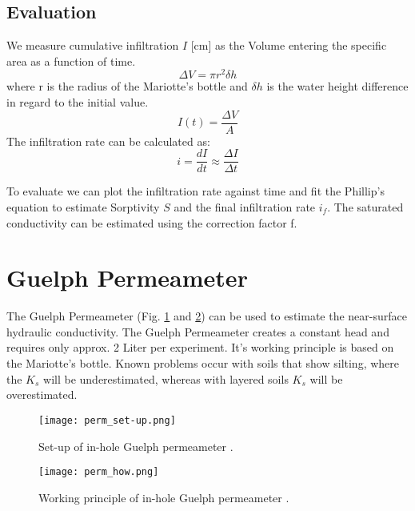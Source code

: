 \documentclass[
10pt, %
a4paper, %
oneside, %
headinclude,footinclude, %
BCOR5mm, %
]{scrartcl}
\begin{document}
\subsection{Evaluation}
We measure cumulative infiltration $I$ [cm] as the Volume entering the specific area as a function of time. 
 \begin{equation}\label{eq_infSR}
 \Delta V= \pi r^2 \delta h
 \end{equation}
 where r is the radius of the Mariotte's bottle and $\delta h$ is the water height difference in regard to the initial value.
 \begin{equation}\label{eq_infSR}
I(t) =\frac{\Delta V}{A}
 \end{equation}
The infiltration rate can be calculated as:
 \begin{equation}\label{eq_infSR}
 i = \frac{dI}{dt}\approx\frac{\Delta I}{\Delta t}
 \end{equation}

To evaluate we can plot the infiltration rate against time and fit the Phillip's equation to estimate Sorptivity $S$ and the final infiltration rate $i_f$. The saturated conductivity can be estimated using the correction factor f. 
\newpage

\section{Guelph Permeameter}

The Guelph Permeameter (Fig. \ref{GPsetup} and \ref{GPwork}) can be used to estimate the near-surface hydraulic conductivity. The Guelph Permeameter creates a constant head and requires only approx. 2 Liter per experiment. It's working principle is based on the Mariotte's bottle. Known problems occur with soils that show silting, where the $K_s$ will be underestimated, whereas with  layered soils $K_s$ will be overestimated. 

\begin{figure}[!h]
	\centering
	\texttt{[image: perm\_set-up.png]}
	\caption{\label{GPsetup}Set-up of in-hole Guelph permeameter \cite{guelph_eil}.}
\end{figure}

\begin{figure}[!h]
		\centering
	\texttt{[image: perm\_how.png]}
	\caption{\label{GPwork}Working principle of in-hole Guelph permeameter \cite{guelph_eil}.}
\end{figure}
 
\end{document}
